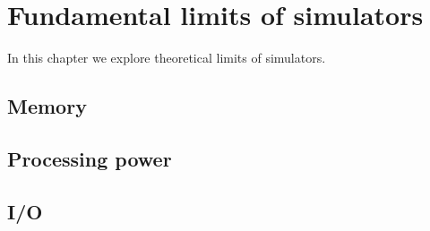 
\chapter{Fundamental limits of simulators} \label{limits}

In this chapter we explore theoretical limits of simulators.

\section{Memory} \label{limits-mem}


\section{Processing power} \label{limits-cpu}


\section{I/O} \label{limits-io}

